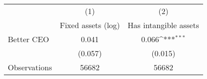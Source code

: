 {
\def\sym#1{\ifmmode^{#1}\else\(^{#1}\)\fi}
\begin{tabular}{l*{2}{c}}
\hline\hline
                    &\multicolumn{1}{c}{(1)}&\multicolumn{1}{c}{(2)}\\
                    &\multicolumn{1}{c}{Fixed assets (log)}&\multicolumn{1}{c}{Has intangible assets}\\
\hline
Better CEO          &       0.041         &       0.066\sym{***}\\
                    &     (0.057)         &     (0.015)         \\
\hline
Observations        &       56682         &       56682         \\
\hline\hline
\end{tabular}
}
